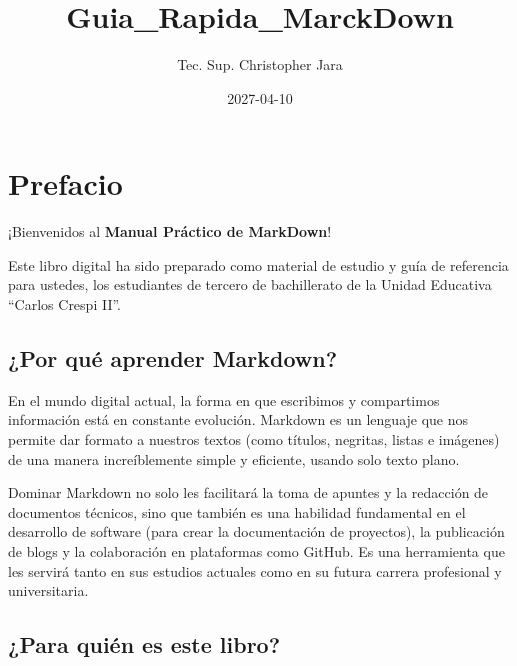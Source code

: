 \documentclass[
  letterpaper,
  DIV=11,
  numbers=noendperiod]{scrreprt}
\title{Guia\_Rapida\_MarckDown}
\author{Tec. Sup. Christopher Jara}
\date{2027-04-10}
\renewcommand*\contentsname{Table of contents}
\newcommand\contentsname{Table of contents}
\begin{document}
\maketitle

\renewcommand*\contentsname{Table of contents}
{
\hypersetup{linkcolor=}
\setcounter{tocdepth}{2}
\tableofcontents
}


\chapter*{Prefacio}\label{prefacio}


¡Bienvenidos al \textbf{Manual Práctico de MarkDown}!

Este libro digital ha sido preparado como material de estudio y guía de
referencia para ustedes, los estudiantes de tercero de bachillerato de
la Unidad Educativa ``Carlos Crespi II''.

\section*{¿Por qué aprender
Markdown?}\label{por-quuxe9-aprender-markdown}


En el mundo digital actual, la forma en que escribimos y compartimos
información está en constante evolución. Markdown es un lenguaje que nos
permite dar formato a nuestros textos (como títulos, negritas, listas e
imágenes) de una manera increíblemente simple y eficiente, usando solo
texto plano.

Dominar Markdown no solo les facilitará la toma de apuntes y la
redacción de documentos técnicos, sino que también es una habilidad
fundamental en el desarrollo de software (para crear la documentación de
proyectos), la publicación de blogs y la colaboración en plataformas
como GitHub. Es una herramienta que les servirá tanto en sus estudios
actuales como en su futura carrera profesional y universitaria.

\section*{¿Para quién es este libro?}\label{para-quiuxe9n-es-este-libro}
\end{document}
